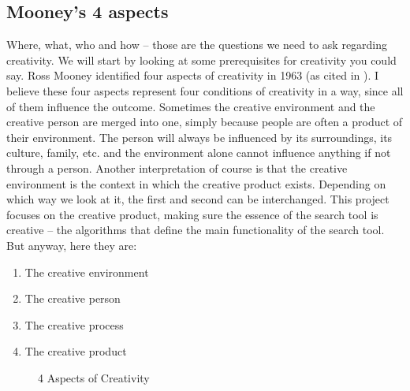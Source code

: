 \subsection{Mooney's 4 aspects}

Where, what, who and how – those are the questions we need to ask regarding creativity. We will start by looking at some prerequisites for creativity you could say. Ross Mooney identified four aspects of creativity in 1963 (as cited in \citep{Sternberg1999}). I believe these four aspects represent four conditions of creativity in a way, since all of them influence the outcome. Sometimes the creative environment and the creative person are merged into one, simply because people are often a product of their environment. The person will always be influenced by its surroundings, its culture, family, etc. and the environment alone cannot influence anything if not through a person. Another interpretation of course is that the creative environment is the context in which the creative product exists. Depending on which way we look at it, the first and second can be interchanged. This project focuses on the creative product, making sure the essence of the search tool is creative – the algorithms that define the main functionality of the search tool. But anyway, here they are:

\begin{enumerate}
  \item The creative environment
  \item The creative person
  \item The creative process
  \item The creative product
\end{enumerate}

\begin{figure}[htb] %
  \centering
  \tikzset{every fit/.append style=text badly centered}
\caption[4 Aspects of Creativity]{4 Aspects of Creativity}
\label{fig:4Crea}
\end{figure}

